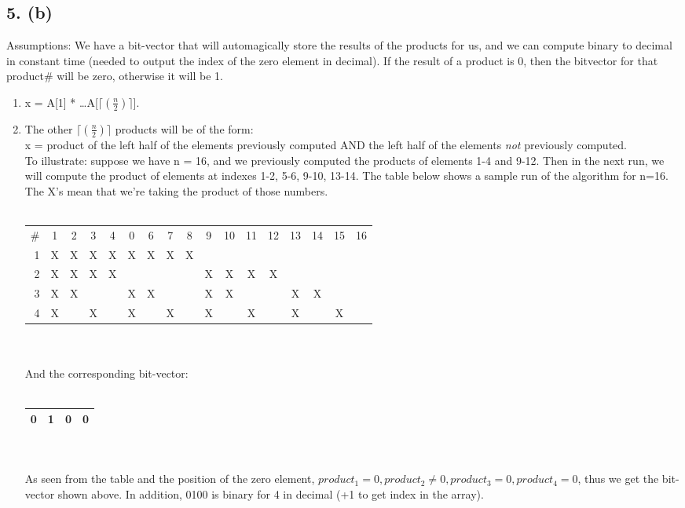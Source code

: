 \documentclass{article}[12pt]
\begin{document}
\subsection*{5. (b)}
Assumptions: We have a bit-vector that will automagically store the results of the products for us, and we can compute binary to decimal in constant time (needed to output the index of the zero element in decimal). If the result of a product is 0, then the bitvector for that product\# will be zero, otherwise it will be 1.
\begin{enumerate}
  \item x = A[1] * \ldots * A[$\lceil(\frac{n}{2})\rceil$].
  \item The other $\lceil(\frac{n}{2})\rceil$ products will be of the form: \\
    x = product of the left half of the elements previously computed AND the left half of the elements \emph{not} previously computed. \\
  To illustrate: suppose we have n = 16, and we previously computed the products of elements 1-4 and 9-12. Then in the next run, we will compute the product of elements at indexes 1-2, 5-6, 9-10, 13-14. The table below shows a sample run of the algorithm for n=16. The X's mean that we're taking the product of those numbers. \\ \\
  \begin{tabular}{r|cccccccccccccccc}
    \#  & 1 & 2 & 3 & 4 & 0 & 6 & 7 & 8 & 9 & 10 & 11 & 12 & 13 & 14 & 15 & 16 \\
    1   & X & X & X & X & X & X & X & X \\
    2   & X & X & X & X &   &   &   &   & X & X  & X  & X \\
    3   & X & X &   &   & X & X &   &   & X & X  &    &    & X  & X \\
    4   & X &   & X &   & X &   & X &   & X &    & X  &    & X  &    & X \\
  \end{tabular} \\ \\
  And the corresponding bit-vector: \\ \\
  \begin{tabular}{|cccc|}
    \hline
    0 & 1 & 0 & 0 \\
    \hline
  \end{tabular} \\ \\
  As seen from the table and the position of the zero element, $product_{1}=0, product_{2}\neq0, product_{3}=0, product_{4}=0$, thus we get the bit-vector shown above. In addition, 0100 is binary for 4 in decimal (+1 to get index in the array).\\

\end{enumerate}
\end{document}
